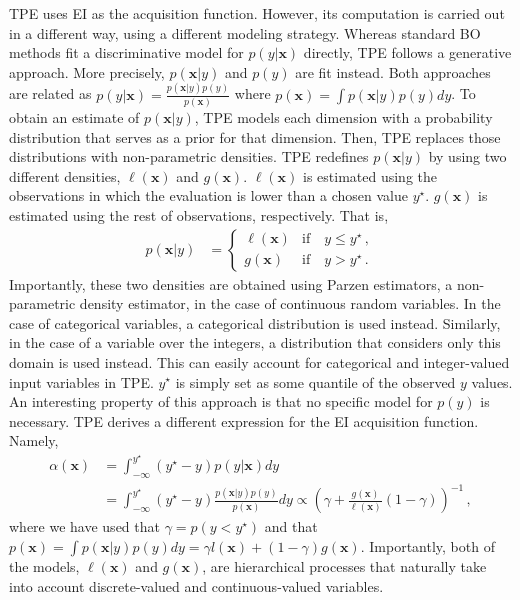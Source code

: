 TPE uses EI as the acquisition function. However, its computation is carried out in a
different way, using a different modeling strategy. Whereas standard BO methods fit a
discriminative model for $p(y|\mathbf{x})$ directly, TPE follows a generative approach. More
precisely, $p(\mathbf{x}|y)$ and $p(y)$ are fit instead. Both approaches are related as
$p(y|\mathbf{x}) = \frac{p(\mathbf{x}|y)p(y)}{p(\mathbf{x})}$ where $p(\mathbf{x}) = \int p(\mathbf{x}|y)p(y)dy$.
To obtain an estimate of  $p(\mathbf{x}|y)$, TPE models each dimension with a probability distribution that serves
as a prior for that dimension. Then, TPE replaces those distributions with non-parametric densities.
TPE redefines $p(\mathbf{x}|y)$ by using two different densities, $\ell(\mathbf{x})$ and $g(\mathbf{x})$.
$\ell(\mathbf{x})$ is estimated using the observations in which the evaluation is lower than a
chosen value $y^\star$. $g(\mathbf{x})$ is estimated using the rest of observations, respectively. That is,
\begin{align}
p(\mathbf{x}|y) & = \left\{ \begin{array}{cc}
        \ell(\mathbf{x}) & \text{if} \quad y \leq y^\star \,, \\
        g(\mathbf{x}) & \text{if} \quad y > y^\star \,.  
\end{array} \right.
\end{align}
Importantly, these two densities are obtained using Parzen estimators, a non-parametric density estimator,
in the case of continuous random variables. In the case of  categorical
variables, a categorical distribution is used instead. Similarly, in the case of a variable over the integers,
a distribution that considers only this domain is used instead. This can easily account for categorical and integer-valued
input variables in TPE. $y^\star$ is simply set as some quantile of the observed $y$ values.
An interesting property of this approach is that no specific model for $p(y)$ is necessary.
TPE derives a different expression for the EI acquisition function. Namely,
\begin{align}
\alpha(\mathbf{x}) & = \int_{-\infty}^{y^\star}(y^\star-y)p(y|\mathbf{x})dy  \nonumber \\
        & = \int_{-\infty}^{y^\star}
        (y^\star-y)\frac{p(\mathbf{x}|y)p(y)}{p(\mathbf{x})} dy \propto (\gamma + \frac{g(\mathbf{x})}{\ell(\mathbf{x})}(1-\gamma))^{-1}\,,
\end{align}
where we have used that $\gamma = p(y<y^\star)$ and that $p(\mathbf{x}) = \int p(\mathbf{x}|y)p(y)dy = \gamma l(\mathbf{x}) +
(1-\gamma)g(\mathbf{x})$. Importantly, both of the models, $\ell(\mathbf{x})$ and $g(\mathbf{x})$, are
hierarchical processes that naturally take into account discrete-valued and continuous-valued variables.

